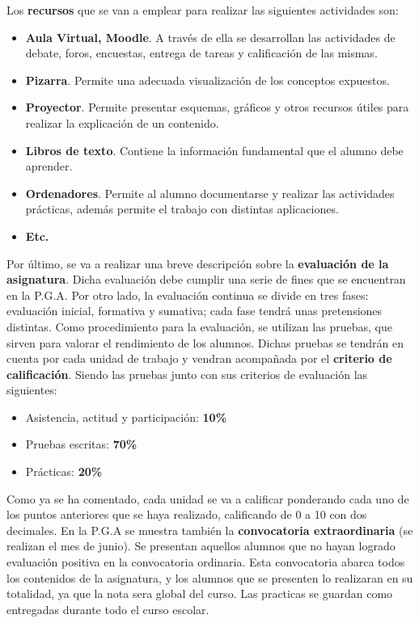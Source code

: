\documentclass[spanish,12pt, a4paper,twoside]{paper}
\begin{document}
\justify
Los \textbf{recursos} que se van a emplear para realizar las siguientes actividades son:
\begin{itemize}
\item \textbf{Aula Virtual, Moodle}. A través de ella se desarrollan las actividades de debate, foros, encuestas, entrega de tareas y calificación de las mismas.
\item \textbf{Pizarra}. Permite una adecuada visualización de los conceptos expuestos.
\item \textbf{Proyector}. Permite presentar esquemas, gráficos y otros recursos útiles para realizar la explicación de un contenido.
\item \textbf{Libros de texto}. Contiene la información fundamental que el alumno debe aprender.
\item \textbf{Ordenadores}. Permite al alumno documentarse y realizar las actividades prácticas, además permite el trabajo con distintas aplicaciones.
\item \textbf{Etc.}
\end{itemize}
\justify
Por último, se va a realizar una breve descripción sobre la \textbf{evaluación de la asignatura}. Dicha evaluación debe cumplir una serie de fines que se encuentran en la P.G.A. Por otro lado, la evaluación continua se divide en tres fases: evaluación inicial, formativa y sumativa; cada fase tendrá unas pretensiones distintas. 
\justify
Como procedimiento para la evaluación, se utilizan las pruebas, que sirven para valorar el rendimiento de los alumnos. Dichas pruebas se tendrán en cuenta por cada unidad de trabajo y vendran acompañada por el \textbf{criterio de calificación}. Siendo las pruebas junto con sus criterios de evaluación las siguientes:
\begin{itemize}
\item Asistencia, actitud y participación: \textbf{10\%}
\item Pruebas escritas: \textbf{70\%}
\item Prácticas: \textbf{20\%}
\end{itemize}
\justify
Como ya se ha comentado, cada unidad se va a calificar ponderando cada uno de los puntos anteriores que se haya realizado, calificando de 0 a 10 con dos decimales.
\justify
En la P.G.A se muestra también la \textbf{convocatoria extraordinaria} (se realizan el mes de junio). Se presentan aquellos alumnos que no hayan logrado evaluación positiva en la convocatoria ordinaria. Esta convocatoria abarca todos los contenidos de la asignatura, y los alumnos que se presenten lo realizaran en su totalidad, ya que la nota sera global del curso. Las practicas se guardan como entregadas durante todo el curso escolar.
\end{document}
